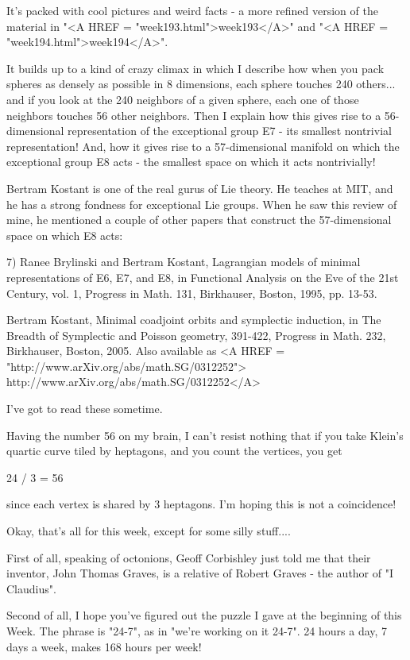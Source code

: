 It's packed with cool pictures and weird facts - a more refined
version of the material in "<A HREF = "week193.html">week193</A>" and "<A HREF = "week194.html">week194</A>".  

It builds up to a kind of crazy climax in which I describe how when you 
pack spheres as densely as possible in 8 dimensions, each sphere touches 
240 others... and if you look at the 240 neighbors of a given sphere, each 
one of those neighbors touches 56 other neighbors.  Then I explain how this 
gives rise to a 56-dimensional representation of the exceptional group E7 -
its smallest nontrivial representation!  And, how it
gives rise to a 57-dimensional manifold on which the exceptional group E8 
acts - the smallest space on which it acts nontrivially!   

Bertram Kostant is one of the real gurus of Lie theory.  He teaches at
MIT, and he has a strong fondness for exceptional Lie groups.  When he saw 
this review of mine, he mentioned a couple of other papers that construct 
the 57-dimensional space on which E8 acts:

7) Ranee Brylinski and Bertram Kostant, Lagrangian models of minimal
representations of E6, E7, and E8, in Functional Analysis on the Eve
of the 21st Century, vol. 1, Progress in Math. 131, Birkhauser, Boston, 
1995, pp. 13-53.

Bertram Kostant, Minimal coadjoint orbits and symplectic induction,
in The Breadth of Symplectic and Poisson geometry, 391-422, 
Progress in Math. 232, Birkhauser, Boston, 2005.  Also
available as <A HREF = "http://www.arXiv.org/abs/math.SG/0312252">
http://www.arXiv.org/abs/math.SG/0312252</A>

I've got to read these sometime.

Having the number 56 on my brain, I can't resist nothing that if
you take Klein's quartic curve tiled by heptagons, and you count 
the vertices, you get 

24  / 3 = 56

since each vertex is shared by 3 heptagons.  I'm hoping this is
not a coincidence!  

Okay, that's all for this week, except for some silly stuff....

First of all, speaking of octonions, Geoff Corbishley just told me 
that their inventor, John Thomas Graves, is a relative of Robert 
Graves - the author of "I Claudius". 

Second of all, I hope you've figured out the puzzle I gave at the 
beginning of this Week.  The phrase is "24-7", as in "we're working 
on it 24-7".  24 hours a day, 7 days a week, makes 168 hours per week!

